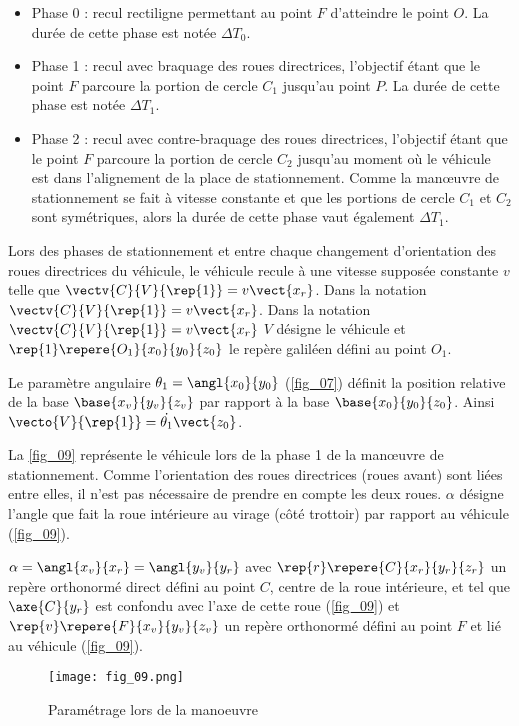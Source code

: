 \begin{itemize}
\item Phase 0 : recul rectiligne permettant au point $F$ d’atteindre le point $O$. La durée de cette phase est notée $\Delta T_0$.
\item Phase 1 : recul avec braquage des roues directrices, l’objectif étant que le point $F$ parcoure la portion de
cercle $C_1$ jusqu’au point $P$. La durée de cette phase est notée $\Delta T_1$.
\item Phase 2 : recul avec contre-braquage des roues directrices, l’objectif étant que le point $F$ parcoure la portion
de cercle $C_2$ jusqu’au moment où le véhicule est dans l’alignement de la place de stationnement. Comme la
manœuvre de stationnement se fait à vitesse constante et que les portions de cercle $C_1$
et $C_2$ sont symétriques, alors la durée de cette phase vaut également $\Delta T_1$.
\end{itemize}
Lors des phases de stationnement et entre chaque changement d’orientation des roues directrices du véhicule,
le véhicule recule à une vitesse supposée constante $v$ telle que $\vectv{C}{V}{\rep{1}}=v\vect{x_r}$. Dans la notation
$\vectv{C}{V}{\rep{1}}=v\vect{x_r}$. 
Dans la notation $\vectv{C}{V}{\rep{1}}=v\vect{x_r}$ $V$ désigne le véhicule et $\rep{1}\repere{O_1}{x_0}{y_0}{z_0}$
le repère galiléen défini au point $O_1$.

Le paramètre angulaire $\theta_1 = \angl{x_0}{y_0}$ (\autoref{fig_07}) définit la position relative de la base $\base{x_v}{y_v}{z_v}$
par rapport à la base $\base{x_0}{y_0}{z_0}$. Ainsi $\vecto{V}{\rep{1}} = \dot{\theta_1}\vect{z_0}$.

La \autoref{fig_09} représente le véhicule lors de la phase 1 de la manœuvre de stationnement. Comme l’orientation des
roues directrices (roues avant) sont liées entre elles, il n’est pas nécessaire de prendre en compte les deux roues.
$\alpha$ désigne l’angle que fait la roue intérieure au virage (côté trottoir) par rapport au véhicule (\autoref{fig_09}).

 $\alpha = \angl{x_v}{x_r}=\angl{y_v}{y_r}$
 avec $\rep{r} \repere{C}{x_r}{y_r}{z_r}$ 
un repère orthonormé direct défini au point $C$, centre de la roue intérieure, et tel que $\axe{C}{y_r}$ est confondu avec l’axe de cette roue (\autoref{fig_09}) et $\rep{v}\repere{F}{x_v}{y_v}{z_v}$ un repère
orthonormé défini au point $F$ et lié au véhicule (\autoref{fig_09}).

\begin{figure}[H]
\centering
\texttt{[image: fig\_09.png]}
\caption{Paramétrage lors de la manoeuvre \label{fig_09}}
\end{figure}


